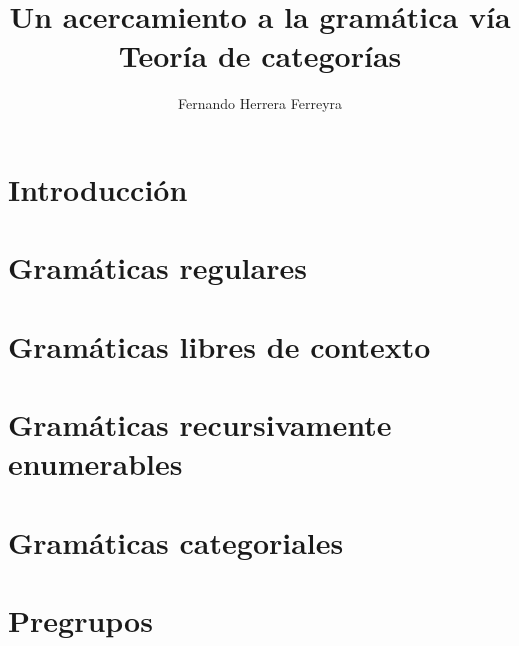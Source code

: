 \documentclass[letterpaper,spanish,12pt]{book}
\author{Fernando Herrera Ferreyra}
\title{Un acercamiento a la gramática vía Teoría de categorías}
\begin{document}
\frontmatter
\maketitle

\setcounter{page}{2}
\tableofcontents

\mainmatter

\chapter{Introducción}

	
\chapter{Gramáticas regulares}


\chapter{Gramáticas libres de contexto}


\chapter{Gramáticas recursivamente enumerables}


\chapter{Gramáticas categoriales}


\chapter{Pregrupos}



\end{document}

